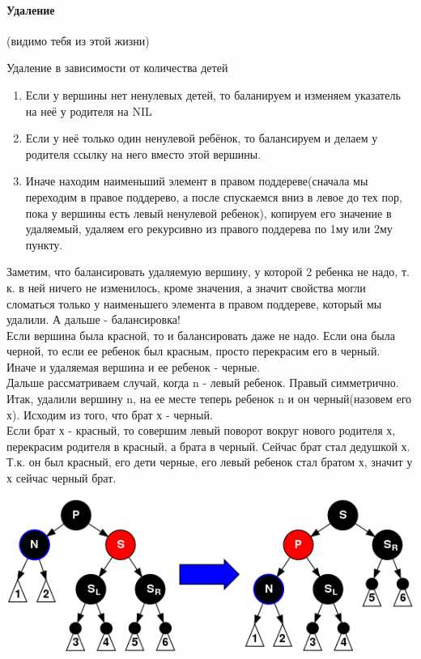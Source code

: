 \documentclass[a4paper,10pt]{article}
\begin{document}
\paragraph{Удаление}(видимо тебя из этой жизни)\\
\begin{center} Удаление в зависимости от количества детей \end{center}
\begin{enumerate}
	\item Если у вершины нет ненулевых детей, то баланируем и изменяем указатель на неё у родителя на NIL
	\item Если у неё только один ненулевой ребёнок, то балансируем и делаем у родителя ссылку на него вместо этой вершины.
	\item Иначе находим наименьший элемент в правом поддереве(сначала мы переходим в правое поддерево, а после спускаемся вниз в левое до тех пор, пока у вершины есть левый ненулевой ребенок), копируем его значение в удаляемый, удаляем его рекурсивно из правого поддерева по 1му или 2му пункту.
\end{enumerate}
Заметим, что балансировать удаляемую вершину, у которой 2 ребенка не надо, т. к. в ней ничего не изменилось, кроме значения, а значит свойства могли сломаться только у наименьшего элемента в правом поддереве, который мы удалили.
А дальше - балансировка!\\
Если вершина была красной, то и балансировать даже не надо.
Если она была черной, то если ее ребенок был красным, просто перекрасим его в черный.\\
Иначе и удаляемая вершина и ее ребенок - черные.\\
Дальше рассматриваем случай, когда n - левый ребенок. Правый симметрично.
Итак, удалили вершину n, на ее месте теперь ребенок n и он черный(назовем его х). Исходим из того, что брат х - черный.\\
Если брат х - красный, то совершим левый поворот вокруг нового родителя х, перекрасим родителя в красный, а брата в черный. Сейчас брат стал дедушкой х. Т.к. он был красный, его дети черные, его левый ребенок стал братом х, значит у х сейчас черный брат.\\
\begin{center}\includegraphics[scale=0.7]{rbt_del_1.png}\end{center} 
\end{document}
